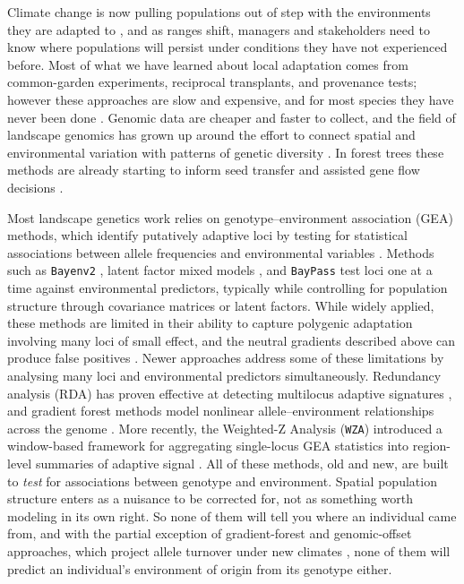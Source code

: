 \documentclass[]{article}
\begin{document}
Climate change is now pulling populations out of step
with the environments they are adapted to \citep{lee_ipcc_2023},
and as ranges shift, managers and stakeholders need to know
where populations will persist under conditions
they have not experienced before.
Most of what we have learned about local adaptation comes from
common-garden experiments, reciprocal transplants,
and provenance tests; however these approaches are slow and expensive,
and for most species they have never been done
\citep{aitken_assisted_2013}.
Genomic data are cheaper and faster to collect,
and the field of landscape genomics has grown up around
the effort to connect spatial and environmental variation
with patterns of genetic diversity
\citep{manel_landscape_2003, rellstab_practical_2015}.
In forest trees these methods are already starting to inform
seed transfer and assisted gene flow decisions
\citep{aitken_bemmels_2016}.

Most landscape genetics work relies on genotype--environment association
(GEA) methods, which identify putatively adaptive loci
by testing for statistical associations
between allele frequencies and environmental variables
\citep{rellstab_practical_2015}.
Methods such as \texttt{Bayenv2}
\citep{guenther_bayenv2_2013},
latent factor mixed models
\citep{frichot_lfmm_2013},
and \texttt{BayPass} \citep{gautier_baypass_2015}
test loci one at a time against environmental predictors,
typically while controlling for population structure
through covariance matrices or latent factors.
While widely applied, these methods
are limited in their ability to capture
polygenic adaptation involving many loci of small effect,
and the neutral gradients described above
can produce false positives
\citep{lotterhos_whitlock_2015}.
Newer approaches address some of these limitations
by analysing many loci and environmental predictors simultaneously.
Redundancy analysis (RDA) has proven effective
at detecting multilocus adaptive signatures
\citep{forester_comparing_2018, capblancq_rda_2021},
and gradient forest methods model
nonlinear allele--environment relationships
across the genome \citep{fitzpatrick_gradient_2015}.
More recently, the Weighted-Z Analysis (\texttt{WZA}) introduced
a window-based framework for aggregating
single-locus GEA statistics
into region-level summaries of adaptive signal
\citep{booker_wza_2024}.
All of these methods, old and new, are built to \emph{test}
for associations between genotype and environment.
Spatial population structure enters as a nuisance
to be corrected for, not as something worth modeling in its own right.
So none of them will tell you where an individual came from,
and with the partial exception of gradient-forest and genomic-offset
approaches, which project allele turnover under new climates
\citep{fitzpatrick_gradient_2015}, none of them will predict
an individual's environment of origin from its genotype either.
\end{document}
